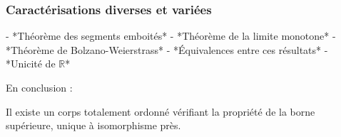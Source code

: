 \subsubsection{Caractérisations diverses et variées}
- *Théorème des segments emboités*
- *Théorème de la limite monotone*
- *Théorème de Bolzano-Weierstrass*
- *Équivalences entre ces résultats*
- *Unicité de $\mathbb{R}$*

En conclusion :
\begin{theoreme}
    Il existe un corps totalement ordonné vérifiant la propriété de la borne supérieure, unique à isomorphisme près.    
\end{theoreme}

